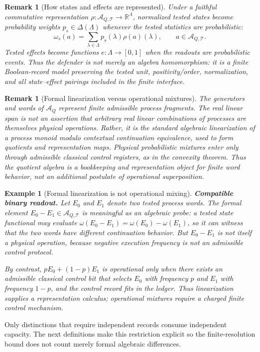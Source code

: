 \documentclass[11pt]{article}
\newtheorem{example}[theorem]{Example}
\newtheorem{remark}[theorem]{Remark}
\newcommand{\AQtest}{\mathcal A_{Q,\mathcal T}}
\begin{document}
\begin{remark}[How states and effects are represented]\label{rem:states-effects-represented}
Under a faithful commutative representation $\rho:\AQtest\to\mathbb R^\Lambda$, normalized tested states become probability weights $p_s\in\Delta(\Lambda)$ whenever the tested statistics are probabilistic:
\[
  \omega_s(a)=\sum_{\lambda\in\Lambda}p_s(\lambda)\rho(a)(\lambda),
  \qquad a\in\AQtest .
\]
Tested effects become functions $e:\Lambda\to[0,1]$ when the readouts are probabilistic events.  Thus the defender is not merely an algebra homomorphism: it is a finite Boolean-record model preserving the tested unit, positivity/order, normalization, and all state--effect pairings included in the finite interface.
\end{remark}

\begin{remark}[Formal linearization versus operational mixtures]\label{rem:linearization-not-mixture}
The generators and words of $\mathcal A_Q$ represent finite admissible process fragments.  The real linear span is not an assertion that arbitrary real linear combinations of processes are themselves physical operations.  Rather, it is the standard algebraic linearization of a process monoid modulo contextual continuation equivalence, used to form quotients and representation maps.  Physical probabilistic mixtures enter only through admissible classical control registers, as in the convexity theorem.  Thus the quotient algebra is a bookkeeping and representation object for finite word behavior, not an additional postulate of operational superposition.
\end{remark}

\begin{example}[Formal linearization is not operational mixing]\label{ex:linearization-vs-mixture}
\textbf{Compatible binary readout.}
Let \(E_0\) and \(E_1\) denote two tested process words.  The formal element \(E_0-E_1\in\AQtest\) is meaningful as an algebraic probe: a tested state functional may evaluate \(\omega(E_0-E_1)=\omega(E_0)-\omega(E_1)\), so it can witness that the two words have different continuation behavior.  But \(E_0-E_1\) is not itself a physical operation, because negative execution frequency is not an admissible control protocol.

By contrast, \(pE_0+(1-p)E_1\) is operational only when there exists an admissible classical control bit that selects \(E_0\) with frequency \(p\) and \(E_1\) with frequency \(1-p\), and the control record fits in the ledger.  Thus linearization supplies a representation calculus; operational mixtures require a charged finite control mechanism.
\end{example}
Only distinctions that require independent records consume independent capacity.  The next definitions make this restriction explicit so the finite-resolution bound does not count merely formal algebraic differences.
\end{document}
